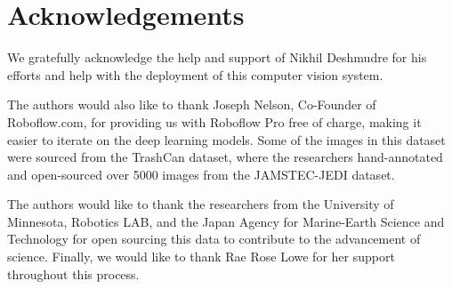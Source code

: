 \documentclass[a4paper,fleqn]{cas-dc}
\begin{document}
\section{Acknowledgements}
We gratefully acknowledge the help and support of Nikhil Deshmudre for his efforts and help with the deployment of this computer vision system. 

The authors would also like to thank Joseph Nelson, Co-Founder of Roboflow.com, for providing us with Roboflow Pro free of charge, making it easier to iterate on the deep learning models. Some of the images in this dataset were sourced from the TrashCan dataset, where the researchers hand-annotated and open-sourced over 5000 images from the JAMSTEC-JEDI dataset. 

The authors would like to thank the researchers from the University of Minnesota, Robotics LAB, and the Japan Agency for Marine-Earth Science and Technology for open sourcing this data to contribute to the advancement of science. Finally, we would like to thank Rae Rose Lowe for her support throughout this process.


\appendix

\printcredits




\end{document}
